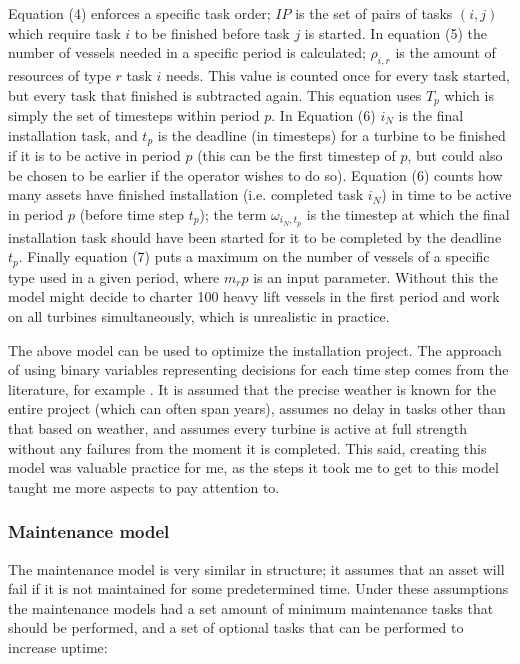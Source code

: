 \documentclass[a4paper,12pt]{article}
\begin{document}
Equation (4) enforces a specific task order; $IP$ is the set of pairs of tasks $(i, j)$ which require task $i$ to be finished before task $j$ is started. In equation (5) the number of vessels needed in a specific period is calculated; $\rho_{i,r}$ is the amount of resources of type $r$ task $i$ needs. This value is counted once for every task started, but every task that finished is subtracted again. This equation uses $T_p$ which is simply the set of timesteps within period $p$. In Equation (6) $i_N$ is the final installation task, and $t_p$ is the deadline (in timesteps) for a turbine to be finished if it is to be active in period $p$ (this can be the first timestep of $p$, but could also be chosen to be earlier if the operator wishes to do so). Equation (6) counts how many assets have finished installation (i.e. completed task $i_N$) in time to be active in period $p$ (before time step $t_p$); the term $\omega_{i_N,t_p}$ is the timestep at which the final installation task should have been started for it to be completed by the deadline $t_p$. Finally equation (7) puts a maximum on the number of vessels of a specific type used in a given period, where $m_rp$ is an input parameter. Without this the model might decide to charter 100 heavy lift vessels in the first period and work on all turbines simultaneously, which is unrealistic in practice. 

\bigskip

The above model can be used to optimize the installation project. The approach of using binary variables representing decisions for each time step comes from the literature, for example \cite{besnard2011stochastic,irawan2019optimisation}. It is assumed that the precise weather is known for the entire project (which can often span years), assumes no delay in tasks other than that based on weather, and assumes every turbine is active at full strength without any failures from the moment it is completed. This said, creating this model was valuable practice for me, as the steps it took me to get to this model taught me more aspects to pay attention to. 

\subsubsection{Maintenance model}
The maintenance model is very similar in structure; it assumes that an asset will fail if it is not maintained for some predetermined time. Under these assumptions the maintenance models had a set amount of minimum maintenance tasks that should be performed, and a set of optional tasks that can be performed to increase uptime:
\end{document}
